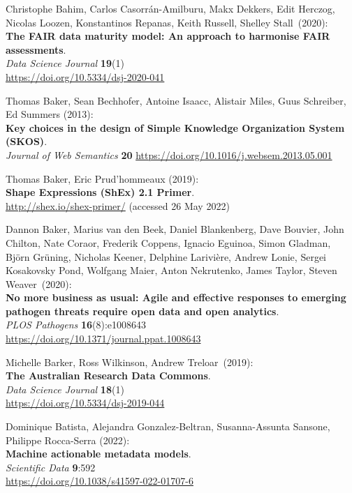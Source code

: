 \begin{thebibliography}{9}
Christophe Bahim, Carlos Casorrán-Amilburu, Makx Dekkers, Edit Herczog, Nicolas Loozen, Konstantinos Repanas, Keith Russell, Shelley Stall~(2020):\\
\textbf{The FAIR data maturity model: An approach to harmonise FAIR assessments}.\\
\emph{Data Science Journal} \textbf{19}(1)\\
\url{https://doi.org/10.5334/dsj-2020-041}

Thomas Baker, Sean Bechhofer, Antoine Isaacc, Alistair Miles, Guus Schreiber, Ed Summers (2013):\\
\textbf{Key choices in the design of Simple Knowledge Organization System (SKOS)}.\\
\emph{Journal of Web Semantics} \textbf{20}
\url{https://doi.org/10.1016/j.websem.2013.05.001}

Thomas Baker, Eric Prud'hommeaux (2019): \\
\textbf{Shape {Expressions} ({ShEx}) 2.1 {Primer}}. \\
\url{http://shex.io/shex-primer/} (accessed 26 May 2022)

Dannon Baker, Marius van den Beek, Daniel Blankenberg, Dave
Bouvier, John Chilton, Nate Coraor, Frederik Coppens, Ignacio Eguinoa,
Simon Gladman, Björn Grüning, Nicholas Keener, Delphine Larivière,
Andrew Lonie, Sergei Kosakovsky Pond, Wolfgang Maier, Anton Nekrutenko,
James Taylor, Steven Weaver~(2020):\\
\textbf{No more business as usual: Agile and effective responses to
emerging pathogen threats require open data and open analytics}.\\
\emph{PLOS Pathogens} \textbf{16}(8):e1008643 \\
\url{https://doi.org/10.1371/journal.ppat.1008643}

Michelle Barker, Ross Wilkinson, Andrew Treloar~(2019):\\
\textbf{The Australian Research Data Commons}.\\
\emph{Data Science Journal} \textbf{18}(1) \\
\url{https://doi.org/10.5334/dsj-2019-044}

Dominique Batista, Alejandra Gonzalez-Beltran, Susanna-Assunta Sansone, Philippe Rocca-Serra (2022):\\
\textbf{Machine actionable metadata models}.\\
\emph{Scientific Data} \textbf{9}:592 \\
\url{https://doi.org/10.1038/s41597-022-01707-6}


\end{thebibliography}
